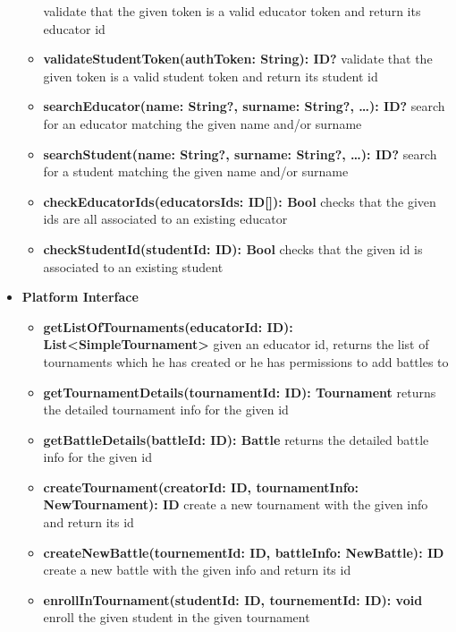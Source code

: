 \begin{itemize}
\begin{itemize}
                    validate that the given token is a valid educator token and return its educator id
              \item \textbf{validateStudentToken(authToken: String): ID?}
                    validate that the given token is a valid student token and return its student id
              \item \textbf{searchEducator(name: String?, surname: String?, \ldots): ID?}
                    search for an educator matching the given name and/or surname
              \item \textbf{searchStudent(name: String?, surname: String?, \ldots): ID?}
                    search for a student matching the given name and/or surname
              \item \textbf{checkEducatorIds(educatorsIds: ID[]): Bool}
                    checks that the given ids are all associated to an existing educator
              \item \textbf{checkStudentId(studentId: ID): Bool}
                    checks that the given id is associated to an existing student
          \end{itemize}
    \item \textbf{Platform Interface}
          \begin{itemize}
              \item \textbf{getListOfTournaments(educatorId: ID): List<SimpleTournament>}
                    given an educator id, returns the list of tournaments which he has created
                    or he has permissions to add battles to
              \item \textbf{getTournamentDetails(tournamentId: ID): Tournament}
                    returns the detailed tournament info for the given id
              \item \textbf{getBattleDetails(battleId: ID): Battle}
                    returns the detailed battle info for the given id
              \item \textbf{createTournament(creatorId: ID, tournamentInfo: NewTournament): ID}
                    create a new tournament with the given info and return its id
              \item \textbf{createNewBattle(tournementId: ID, battleInfo: NewBattle): ID}
                    create a new battle with the given info and return its id
              \item \textbf{enrollInTournament(studentId: ID, tournementId: ID): void}
                    enroll the given student in the given tournament

\end{itemize}
\end{itemize}
